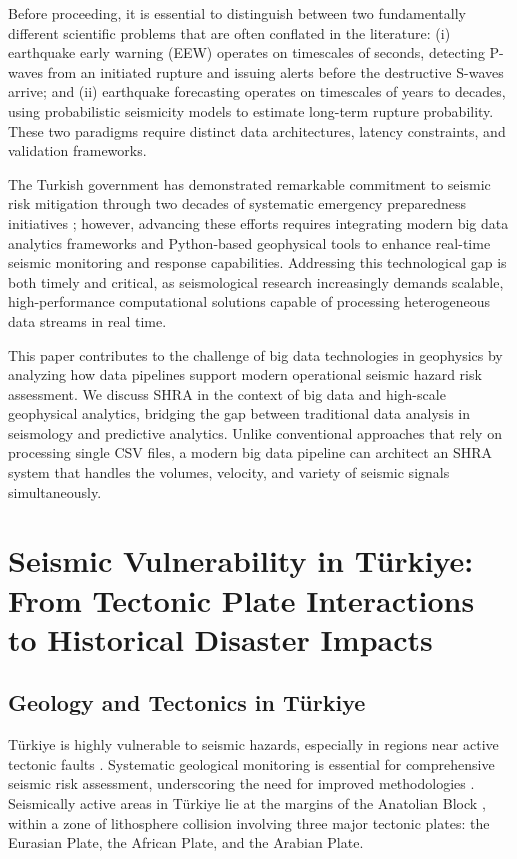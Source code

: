 \documentclass[data,article,accept,pdftex,moreauthors]{Definitions/mdpi}
\begin{document}
Before proceeding, it is essential to distinguish between two fundamentally different scientific problems that are often conflated in the literature: (i) earthquake early warning (EEW) operates on timescales of seconds, detecting P-waves from an initiated rupture and issuing alerts before the destructive S-waves arrive; and (ii) earthquake forecasting operates on timescales of years to decades, using probabilistic seismicity models to estimate long-term rupture probability. These two paradigms require distinct data architectures, latency constraints, and validation frameworks.

The Turkish government has demonstrated remarkable commitment to seismic risk mitigation through two decades of systematic emergency preparedness initiatives \cite{ismep2026}; however, advancing these efforts requires integrating modern big data analytics frameworks and Python-based geophysical tools to enhance real-time seismic monitoring and response capabilities. Addressing this technological gap is both timely and critical, as seismological research increasingly demands scalable, high-performance computational solutions capable of processing heterogeneous data streams in real time. 

This paper contributes to the challenge of big data technologies in geophysics by analyzing how data pipelines support modern operational seismic hazard risk assessment. We discuss SHRA in the context of big data and high-scale geophysical analytics, bridging the gap between traditional data analysis in seismology and predictive analytics. Unlike conventional approaches that rely on processing single CSV files, a modern big data pipeline can architect an SHRA system that handles the volumes, velocity, and variety of seismic signals simultaneously.


\section{Seismic Vulnerability in Türkiye: From Tectonic Plate Interactions to Historical Disaster Impacts}

\subsection{Geology and Tectonics in Türkiye}

Türkiye is highly vulnerable to seismic hazards, especially in regions near active tectonic faults \cite{Basaran2014,Kandregula2024}. Systematic geological monitoring is essential for comprehensive seismic risk assessment, underscoring the need for improved methodologies \cite{Korkmaz2013}. Seismically active areas in Türkiye lie at the margins of the Anatolian Block \cite{Abdik}, within a zone of lithosphere collision involving three major tectonic plates: the Eurasian Plate, the African Plate, and the Arabian Plate.
\end{document}
